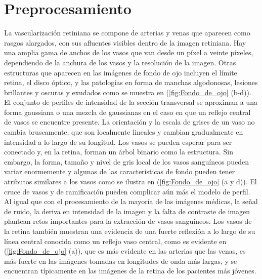 \section{Preprocesamiento}
\label{sec:Preprocesamiento}

La vascularización retiniana se compone de arterias y venas que aparecen como rasgos alargados, con sus afluentes visibles dentro de la imagen retiniana. Hay una amplia gama de anchos de los vasos que van desde un píxel a veinte píxeles, dependiendo de la anchura de los vasos y la resolución de la imagen. Otras estructuras que aparecen en las imágenes de fondo de ojo incluyen el límite retina, el disco óptico, y las patologías en forma de manchas algodonosas, lesiones brillantes y oscuras y exudados como se muestra en (\ref{fig:Fondo_de_ojo} (b-d)).\\

El conjunto de perfiles de intensidad de la sección transversal se aproximan a una forma gaussiana o una mezcla de gaussianas en el caso en que un reflejo central de vasos se encuentre presente. La orientación y la escala de grises de un vaso no cambia bruscamente; que son localmente lineales y cambian gradualmente en intensidad a lo largo de su longitud. Los vasos se pueden esperar para ser conectado y, en la retina, forman un árbol binario como la estructura. Sin embargo, la forma, tamaño y nivel de gris local de los vasos sanguíneos pueden variar enormemente y algunas de las características de fondo pueden tener atributos similares a los vasos como se ilustra en (\ref{fig:Fondo_de_ojo} (a y d)).
El cruce de vasos y de ramificación pueden complicar aún más el modelo de perfil. Al igual que con el procesamiento de la mayoría de las imágenes médicas, la señal de ruido, la deriva en intensidad de la imagen y la falta de contraste de imagen plantean retos importantes para la extracción de vasos sanguíneos.
Los vasos de la retina también muestran una evidencia de una fuerte reflexión a lo largo de su línea central conocida como un reflejo vaso central, como es evidente en (\ref{fig:Fondo_de_ojo}  (a)), que es más evidente en las arterias que las venas, es más fuerte en las imágenes tomadas en longitudes de onda más largas, y se encuentran típicamente en las imágenes de la retina de los pacientes más jóvenes.\cite{fraz2012blood}\\


